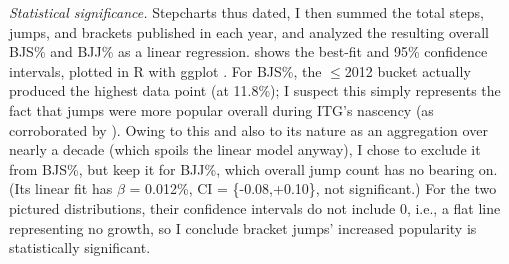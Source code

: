 \documentclass[10pt]{sigplanconf}
\begin{document}
\textit{Statistical significance.}
Stepcharts thus dated, I then summed the total steps, jumps, and brackets published in each year,
and analyzed the resulting overall BJS\% and BJJ\% as a linear regression.
 shows the best-fit and 95\% confidence intervals,
plotted in R \cite{r-lang} with ggplot \cite{ggplot}.
For BJS\%, the $\le$2012 bucket actually produced the highest data point (at 11.8\%);
I suspect this simply represents the fact that jumps were more popular overall during ITG's nascency
(as corroborated by ).
Owing to this and also to its nature as an aggregation over nearly a decade (which spoils the linear model anyway),
I chose to exclude it from BJS\%,
but keep it for BJJ\%, which overall jump count has no bearing on.
(Its linear fit has $\beta$ = 0.012\%, CI = \{-0.08,+0.10\}, not significant.)
For the two pictured distributions, their confidence intervals do not include 0,
i.e., a flat line representing no growth,
so I conclude bracket jumps' increased popularity is statistically significant.

\end{document}
